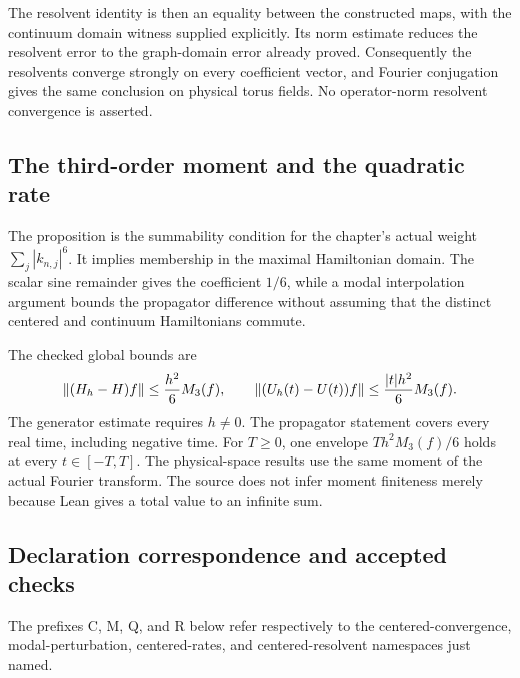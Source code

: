 The resolvent identity is then an equality between the constructed maps, with the continuum domain witness supplied explicitly. Its norm estimate reduces the resolvent error to the graph-domain error already proved. Consequently the resolvents converge strongly on every coefficient vector, and Fourier conjugation gives the same conclusion on physical torus fields. No operator-norm resolvent convergence is asserted.

\subsection{The third-order moment and the quadratic rate}

The proposition  is the summability condition for the chapter's actual weight $\sum_j|k_{n,j}|^6$. It implies membership in the maximal Hamiltonian domain. The scalar sine remainder gives the coefficient $1/6$, while a modal interpolation argument bounds the propagator difference without assuming that the distinct centered and continuum Hamiltonians commute.

The checked global bounds are
\[
 \left\lVert(H_h-H)f\right\rVert\le \frac{h^2}{6}M_3(f),\qquad
 \left\lVert(U_h(t)-U(t))f\right\rVert\le \frac{|t|h^2}{6}M_3(f).
\]
The generator estimate requires $h\ne0$. The propagator statement covers every real time, including negative time. For $T\ge0$, one envelope $Th^2M_3(f)/6$ holds at every $t\in[-T,T]$. The physical-space results use the same moment of the actual Fourier transform. The source does not infer moment finiteness merely because Lean gives a total value to an infinite sum.

\subsection{Declaration correspondence and accepted checks}

The prefixes C, M, Q, and R below refer respectively to the centered-convergence, modal-perturbation, centered-rates, and centered-resolvent namespaces just named.

